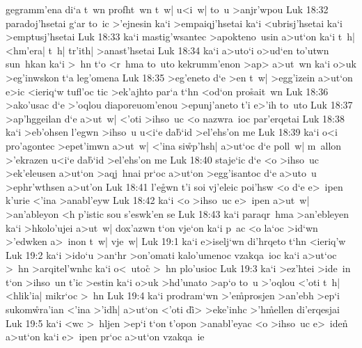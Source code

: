 gegramm'ena
di`a
t~wn
profht~wn
t~w|
u<i~w|
to~u
>anjr'wpou\bibvsend
\vs Luk 18:32
paradoj'hsetai
g`ar
to~ic
>'ejnesin
ka`i
>empaiqj'hsetai
ka`i
<ubrisj'hsetai
ka`i
>emptusj'hsetai\bibvsend
\vs Luk 18:33
ka`i
mastig'wsantec
>apokteno~usin
a>ut`on
ka`i
t~h|
<hm'era|
t~h|
tr'ith|
>anast'hsetai\bibvsend
\vs Luk 18:34
ka`i
a>uto`i
o>ud`en
to'utwn
sun~hkan
ka`i
>~hn
t`o
<r~hma
to~uto
kekrumm'enon
>ap>
a>ut~wn
ka`i
o>uk
>eg'inwskon
t`a
leg'omena\bibvsend
\vs Luk 18:35
>eg'eneto
d`e
>en
t~w|
>egg'izein
a>ut`on
e>ic
<ieriq`w
tufl'oc
tic
>ek'ajhto
par`a
t`hn
<od`on
pro\r{s}ait~wn\bibvsend
{}
\vs Luk 18:36
>ako'usac
d`e
>'oqlou
diaporeuom'enou
>epunj'aneto
t'i
e>'ih
to~uto\bibvsend
\vs Luk 18:37
>ap'hggeilan
d`e
a>ut~w|
<'oti
>ihso~uc
<o
nazwra~ioc
par'erqetai\bibvsend
\vs Luk 18:38
ka`i
>eb'ohsen
l'egwn
>ihso~u
u<i`e
da\r{b}`id
>el'ehs'on
me\bibvsend
\vs Luk 18:39
ka`i
o<i
pro'agontec
>epet'imwn
a>ut~w|
<'ina
si\r{w}p'hsh|
a>ut`oc
d`e
poll~w|
m~allon
>'ekrazen
u<i`e
da\r{b}`id
>el'ehs'on
me\bibvsend
\vs Luk 18:40
staje`ic
d`e
<o
>ihso~uc
>ek'eleusen
a>ut`on
>aqj~hnai
pr`oc
a>ut`on
>egg'isantoc
d`e
a>uto~u
>ephr'wthsen
a>ut'on\bibvsend
\vs Luk 18:41
l'e\r{g}wn
t'i
soi
vj'eleic
poi'hsw
<o
d`e
e>~ipen
k'urie
<'ina
>anabl'eyw\bibvsend
\vs Luk 18:42
ka`i
<o
>ihso~uc
e>~ipen
a>ut~w|
>an'ableyon
<h
p'istic
sou
s'eswk'en
se\bibvsend
\vs Luk 18:43
ka`i
paraqr~hma
>an'ebleyen
ka`i
>hkolo'ujei
a>ut~w|
dox'azwn
t`on
vje`on
ka`i
p~ac
<o
la`oc
>id`wn
>'edwken
a>~inon
t~w|
vje~w|\bibvsend
\vs Luk 19:1
ka`i
e>iselj`wn
di'hrqeto
t`hn
<ieriq'w\bibvsend
\vs Luk 19:2
ka`i
>ido`u
>an`hr
>on'omati
kalo'umenoc
vzakqa~ioc
ka`i
a>ut`oc
>~hn
>arqitel'wnhc
ka`i
o<~utoc\r{}
>~hn
plo'usioc\bibvsend
\vs Luk 19:3
ka`i
>ez'htei
>ide~in
t`on
>ihso~un
t'ic
>estin
ka`i
o>uk
>hd'unato
>ap`o
to~u
>'oqlou
<'oti
t~h|
<hlik'ia|
mikr`oc
>~hn\bibvsend
\vs Luk 19:4
ka`i
prodram`wn
>'e\r{m}prosjen
>an'ebh
>ep`i
sukom\r{w}ra'ian
<'ina
>'idh|
a>ut`on
<'oti
d\r{i}>
>eke'inhc
>'h\r{m}ellen
di'erqesjai\bibvsend
\vs Luk 19:5
ka`i
<wc
>~hljen
>ep`i
t`on
t'opon
>anabl'eyac
<o
>ihso~uc
e>~iden\r{}
a>ut`on
ka`i
e>~ipen
pr`oc
a>ut`on
vzakqa~ie
